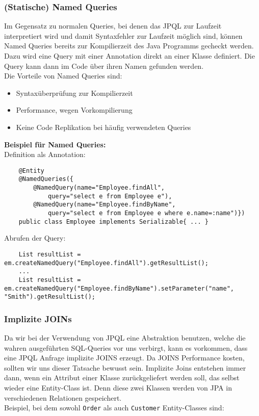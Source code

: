 \subsubsection{(Statische) Named Queries}

Im Gegensatz zu normalen Queries, bei denen das JPQL zur Laufzeit interpretiert wird und damit Syntaxfehler zur Laufzeit möglich sind, können Named Queries bereits zur Kompilierzeit des Java Programms gecheckt werden.\\
Dazu wird eine Query mit einer Annotation direkt an einer Klasse definiert. Die Query kann dann im Code über ihren Namen gefunden werden.\\
Die Vorteile von Named Queries sind:
\begin{itemize}
    \item Syntaxüberprüfung zur Kompilierzeit
    \item Performance, wegen Vorkompilierung
    \item Keine Code Replikation bei häufig verwendeten Queries
\end{itemize}

\textbf{Beispiel für Named Queries:}\\
Definition als Annotation:

\begin{lstlisting}
    @Entity
    @NamedQueries({
        @NamedQuery(name="Employee.findAll",
            query="select e from Employee e"),
        @NamedQuery(name="Employee.findByName",
            query="select e from Employee e where e.name=:name")}) 
    public class Employee implements Serializable{ ... }
\end{lstlisting}

Abrufen der Query:

\begin{lstlisting}
    List resultList = em.createNamedQuery("Employee.findAll").getResultList();
    ...
    List resultList = em.createNamedQuery("Employee.findByName").setParameter("name", "Smith").getResultList(); 
\end{lstlisting}

\subsubsection{Implizite JOINs}

Da wir bei der Verwendung von JPQL eine Abstraktion benutzen, welche die wahren ausgeführten SQL-Queries vor uns verbirgt, kann es vorkommen, dass eine JPQL Anfrage implizite JOINS erzeugt. Da JOINS Performance kosten, sollten wir uns dieser Tatsache bewusst sein. Implizite Joins entstehen immer dann, wenn ein Attribut einer Klasse zurückgeliefert werden soll, das selbst wieder eine Entity-Class ist. Denn diese zwei Klassen werden von JPA in verschiedenen Relationen gespeichert.\\
Beispiel, bei dem sowohl \lstinline{Order} als auch \lstinline{Customer} Entity-Classes sind:

